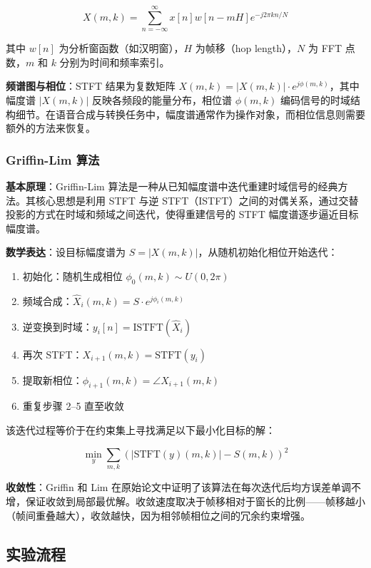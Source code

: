 \documentclass[
  english,
  letterpaper,
  DIV=11,
  numbers=noendperiod]{scrartcl}
\providecommand{\tightlist}{%
  \setlength{\itemsep}{0pt}\setlength{\parskip}{0pt}}
\begin{document}
\[X(m, k) = \sum_{n=-\infty}^{\infty} x[n] w[n - mH] e^{-j 2\pi k n / N}\]

其中 \(w[n]\) 为分析窗函数（如汉明窗），\(H\) 为帧移（hop
length），\(N\) 为 FFT 点数，\(m\) 和 \(k\) 分别为时间和频率索引。

\textbf{频谱图与相位}：STFT 结果为复数矩阵
\(X(m,k) = |X(m,k)| \cdot e^{j\phi(m,k)}\)，其中幅度谱 \(|X(m,k)|\)
反映各频段的能量分布，相位谱 \(\phi(m,k)\)
编码信号的时域结构细节。在语音合成与转换任务中，幅度谱通常作为操作对象，而相位信息则需要额外的方法来恢复。

\subsubsection{Griffin-Lim 算法}\label{griffin-lim-ux7b97ux6cd5}

\textbf{基本原理}：Griffin-Lim
算法是一种从已知幅度谱中迭代重建时域信号的经典方法。其核心思想是利用
STFT 与逆
STFT（ISTFT）之间的对偶关系，通过交替投影的方式在时域和频域之间迭代，使得重建信号的
STFT 幅度谱逐步逼近目标幅度谱。

\textbf{数学表达}：设目标幅度谱为
\(S = |X(m,k)|\)，从随机初始化相位开始迭代：

\begin{enumerate}
\def\labelenumi{\arabic{enumi}.}
\tightlist
\item
  初始化：随机生成相位 \(\phi_0(m,k) \sim U(0, 2\pi)\)
\item
  频域合成：\(\hat{X}_i(m,k) = S \cdot e^{j\phi_i(m,k)}\)
\item
  逆变换到时域：\(y_i[n] = \text{ISTFT}(\hat{X}_i)\)
\item
  再次 STFT：\(X_{i+1}(m,k) = \text{STFT}(y_i)\)
\item
  提取新相位：\(\phi_{i+1}(m,k) = \angle X_{i+1}(m,k)\)
\item
  重复步骤 2--5 直至收敛
\end{enumerate}

该迭代过程等价于在约束集上寻找满足以下最小化目标的解：

\[\min_{y} \sum_{m,k} \left( |\text{STFT}(y)(m,k)| - S(m,k) \right)^2\]

\textbf{收敛性}：Griffin 和 Lim
在原始论文中证明了该算法在每次迭代后均方误差单调不增，保证收敛到局部最优解。收敛速度取决于帧移相对于窗长的比例------帧移越小（帧间重叠越大），收敛越快，因为相邻帧相位之间的冗余约束增强。

\subsection{实验流程}\label{ux5b9eux9a8cux6d41ux7a0b}
\end{document}
